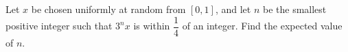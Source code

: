 Let $x$ be chosen uniformly at random from $[0,1]$, and let $n$ be the smallest positive integer such that $3^nx$ is within $\dfrac14$ of an integer. Find the expected value of $n$.
